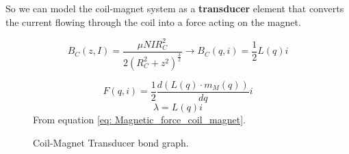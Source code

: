 \pagebreak

\begin{samepage}
    So we can model the coil-magnet system as a \textbf{transducer} element that converts the current flowing through the coil into a force acting on the magnet.
    \nopagebreak

    \begin{equation*}
        B_C(z, I) = \frac{\mu N I R_C^2}{2(R_C^2+z^2)^\frac{3}{2}} \rightarrow B_C(q, i) = \frac{1}{2} L(q) i
    \end{equation*}
    \nopagebreak

    \begin{figure}[H]
        \centering
        \resizebox{.7\linewidth}{!}{
            
        }
        \caption{Coil-Magnet Transducer bond graph.}    
        \label{fig: Coil-Magnet_Transducer}
        
        \begin{equation*}
            F(q, i) = \frac{1}{2} \frac{d \left(L(q) \cdot m_M(q) \right)}{dq} i
        \end{equation*} 
        \begin{equation*}
            \lambda = L(q) i
        \end{equation*}
        From equation \ref{eq: Magnetic_force_coil_magnet}.
    \end{figure}
\end{samepage}

